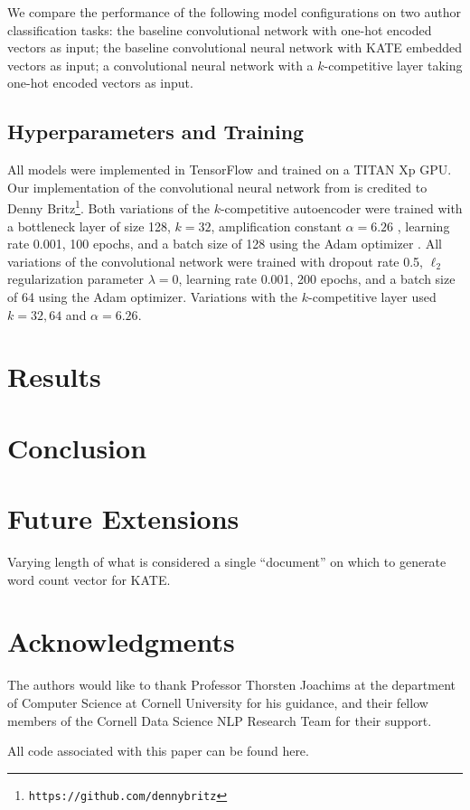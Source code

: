 \documentclass{vldb}
\begin{document}
We compare the performance of the following model configurations on two author classification tasks: the baseline convolutional network with one-hot encoded vectors as input; the baseline convolutional neural network with KATE embedded vectors as input; a convolutional neural network with a $k$-competitive layer taking one-hot encoded vectors as input.

\subsection{Hyperparameters and Training}
All models were implemented in TensorFlow and trained on a TITAN Xp GPU. Our implementation of the convolutional neural network from \cite{Kim14f} is credited to Denny Britz\footnote{{\texttt{https://github.com/dennybritz}}}. Both variations of the $k$-competitive autoencoder were trained with a bottleneck layer of size 128, $k=32$, amplification constant $\alpha=6.26$ \cite{KATE}, learning rate 0.001, 100 epochs, and a batch size of 128 using the Adam optimizer \cite{KingmaB14}. All variations of the convolutional network were trained with dropout rate 0.5, $\ell_2$ regularization parameter $\lambda=0$, learning rate 0.001, 200 epochs, and a batch size of 64 using the Adam optimizer. Variations with the $k$-competitive layer used $k=32, 64$ and $\alpha=6.26$.

\section{Results}

\section{Conclusion}

\section{Future Extensions}
Varying length of what is considered a single ``document'' on which to generate word count vector for KATE.

\section{Acknowledgments}
The authors would like to thank Professor Thorsten Joachims at the department of Computer Science at Cornell University for his guidance, and their fellow members of the Cornell Data Science NLP Research Team for their support.



 

\begin{appendix}
All code associated with this paper can be found here.
\end{appendix}

\balance
\end{document}
